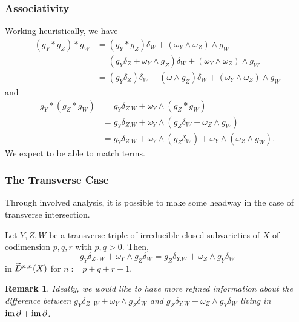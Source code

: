 \documentclass[11pt]{beamer}
\newtheorem{remark}{Remark}
\begin{document}
\begin{frame}
\frametitle{Associativity}
Working heuristically, we have 
\begin{align*}
(g_Y*g_Z)*g_W
&=(g_Y*g_Z)\delta_W+(\omega_Y\wedge\omega_Z)\wedge g_W \\
&=(g_Y\delta_Z+\omega_Y\wedge g_Z)\delta_W+(\omega_Y\wedge\omega_Z)\wedge g_W \\
&=(g_Y\delta_Z)\delta_W+(\omega\wedge g_Z)\delta_W+(\omega_Y\wedge\omega_Z)\wedge g_W
\end{align*}
and
\begin{align*}
g_Y*(g_Z*g_W)
&=g_Y\delta_{Z.W}+\omega_Y\wedge(g_Z*g_W) \\
&=g_Y\delta_{Z.W}+\omega_Y\wedge(g_Z\delta_W+\omega_Z\wedge g_W) \\
&=g_Y\delta_{Z.W}+\omega_Y\wedge(g_Z\delta_W)+\omega_Y\wedge(\omega_Z\wedge g_W).
\end{align*}
We expect to be able to match terms. 

\end{frame}

\begin{frame}
\frametitle{The Transverse Case}
Through involved analysis, it is possible to make some headway in the case of transverse intersection.

\begin{theorem}
Let $Y,Z,W$ be a transverse triple of irreducible closed subvarieties of $X$ of codimension $p,q,r$ with $p,q>0$. Then, 
$$g_Y\delta_{Z\cdot W}+\omega_Y\wedge g_Z\delta_W=g_Z\delta_{Y.W}+\omega_Z\wedge g_Y\delta_W$$
in $\widetilde{D}^{n,n}(X)$ for $n:=p+q+r-1$.
\end{theorem}

\begin{remark}
Ideally, we would like to have more refined information about the difference between $g_Y\delta_{Z\cdot W}+\omega_Y\wedge g_Z\delta_W$ and $g_Z\delta_{Y.W}+\omega_Z\wedge g_Y\delta_W$ living in $\operatorname{im}\partial+\operatorname{im}\overline{\partial}$.
\end{remark}
\end{frame}
\end{document}
